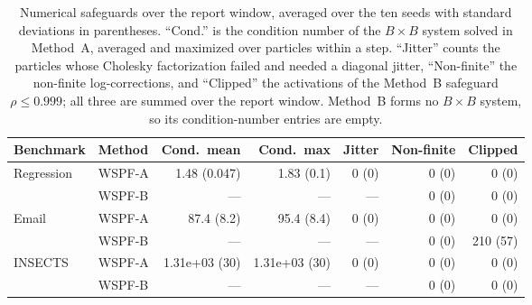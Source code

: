 \begin{table}[htbp]
\centering
\scriptsize
\setlength{\tabcolsep}{3pt}
\caption{Numerical safeguards over the report window, averaged over the ten seeds with standard deviations in parentheses. ``Cond.'' is the condition number of the $B \times B$ system solved in Method~A, averaged and maximized over particles within a step. ``Jitter'' counts the particles whose Cholesky factorization failed and needed a diagonal jitter, ``Non-finite'' the non-finite log-corrections, and ``Clipped'' the activations of the Method~B safeguard $\rho \le 0.999$; all three are summed over the report window. Method~B forms no $B \times B$ system, so its condition-number entries are empty.}
\label{tab:s6b_safeguards}
\begin{tabular}{@{}llrrrrr@{}}
\toprule
Benchmark & Method & Cond.\ mean & Cond.\ max & Jitter & Non-finite & Clipped \\
\midrule
Regression & WSPF-A & 1.48 (0.047) & 1.83 (0.1) & 0 (0) & 0 (0) & 0 (0) \\
 & WSPF-B & --- & --- & --- & 0 (0) & 0 (0) \\
\midrule
Email & WSPF-A & 87.4 (8.2) & 95.4 (8.4) & 0 (0) & 0 (0) & 0 (0) \\
 & WSPF-B & --- & --- & --- & 0 (0) & 210 (57) \\
\midrule
INSECTS & WSPF-A & 1.31e+03 (30) & 1.31e+03 (30) & 0 (0) & 0 (0) & 0 (0) \\
 & WSPF-B & --- & --- & --- & 0 (0) & 0 (0) \\
\bottomrule
\end{tabular}
\end{table}
